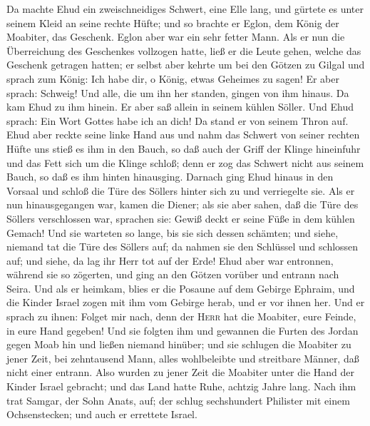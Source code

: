  Da machte Ehud ein zweischneidiges Schwert, eine Elle
lang, und gürtete es unter seinem Kleid an seine rechte Hüfte;
 und so brachte er Eglon, dem König der Moabiter, das
Geschenk. Eglon aber war ein sehr fetter Mann.  Als er
nun die Überreichung des Geschenkes vollzogen hatte, ließ er die Leute
gehen, welche das Geschenk getragen hatten;  er selbst
aber kehrte um bei den Götzen zu Gilgal und sprach zum König: Ich habe
dir, o König, etwas Geheimes zu sagen! Er aber sprach: Schweig! Und
alle, die um ihn her standen, gingen von ihm hinaus. Da kam Ehud zu ihm
hinein.  Er aber saß allein in seinem kühlen Söller. Und
Ehud sprach: Ein Wort Gottes habe ich an dich! Da stand er von seinem
Thron auf.  Ehud aber reckte seine linke Hand aus und
nahm das Schwert von seiner rechten Hüfte uns stieß es ihm in den Bauch,
 so daß auch der Griff der Klinge hineinfuhr und das Fett
sich um die Klinge schloß; denn er zog das Schwert nicht aus seinem
Bauch, so daß es ihm hinten hinausging.  Darnach ging
Ehud hinaus in den Vorsaal und schloß die Türe des Söllers hinter sich
zu und verriegelte sie.  Als er nun hinausgegangen war,
kamen die Diener; als sie aber sahen, daß die Türe des Söllers
verschlossen war, sprachen sie: Gewiß deckt er seine Füße in dem kühlen
Gemach!  Und sie warteten so lange, bis sie sich dessen
schämten; und siehe, niemand tat die Türe des Söllers auf; da nahmen sie
den Schlüssel und schlossen auf; und siehe, da lag ihr Herr tot auf der
Erde!  Ehud aber war entronnen, während sie so zögerten,
und ging an den Götzen vorüber und entrann nach Seira. 
Und als er heimkam, blies er die Posaune auf dem Gebirge Ephraim, und
die Kinder Israel zogen mit ihm vom Gebirge herab, und er vor ihnen her.
 Und er sprach zu ihnen: Folget mir nach, denn der
\textsc{Herr} hat die Moabiter, eure Feinde, in eure Hand gegeben! Und
sie folgten ihm und gewannen die Furten des Jordan gegen Moab hin und
ließen niemand hinüber;  und sie schlugen die Moabiter zu
jener Zeit, bei zehntausend Mann, alles wohlbeleibte und streitbare
Männer, daß nicht einer entrann.  Also wurden zu jener
Zeit die Moabiter unter die Hand der Kinder Israel gebracht; und das
Land hatte Ruhe, achtzig Jahre lang.  Nach ihm trat
Samgar, der Sohn Anats, auf; der schlug sechshundert Philister mit einem
Ochsenstecken; und auch er errettete Israel.

